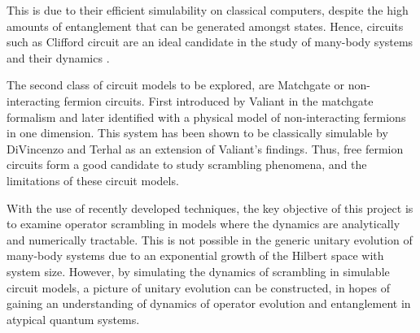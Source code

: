 This is due to their efficient simulability on classical computers, despite the high amounts of entanglement that can be generated amongst states. Hence, circuits such as Clifford circuit are an ideal candidate in the study of many-body systems and their dynamics \cite{https://doi.org/10.48550/arxiv.2210.10129}.

The second class of circuit models to be explored, are Matchgate or non-interacting fermion circuits. First introduced by Valiant \cite{Valiant2001QuantumCT} in the matchgate formalism and later identified with a physical model of non-interacting fermions in one dimension. This system has been shown to be classically simulable by DiVincenzo and Terhal \cite{Terhal2001} as an extension of Valiant's findings. Thus, free fermion circuits form a good candidate to study scrambling phenomena, and the limitations of these circuit models.

With the use of recently developed techniques, the key objective of this project is to examine 
operator scrambling in models where the dynamics are analytically and numerically tractable. This is not
possible in the generic unitary evolution of many-body systems due to an exponential growth of
the Hilbert space with system size. However, by simulating the dynamics of scrambling in simulable circuit models, a picture of unitary evolution can be constructed, in hopes of gaining an understanding of dynamics of operator evolution and entanglement in atypical quantum systems. 





